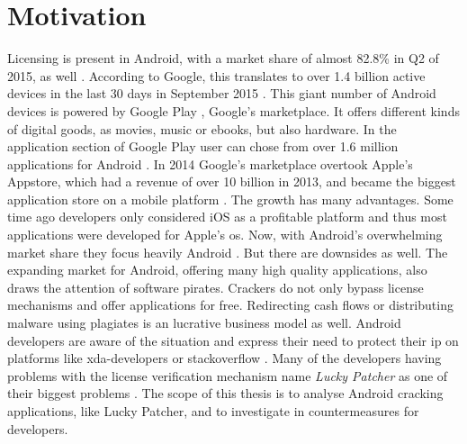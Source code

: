 \section{Motivation} \label{subsection:introduction-motivation}
Licensing is present in Android, with a market share of almost 82.8\% in Q2 of 2015, as well \cite{androidShare}.
According to Google, this translates to over 1.4 billion active devices in the last 30 days in September 2015 \cite{androidDevices}.
This giant number of Android devices is powered by Google Play \cite{googlePlay}, Google's marketplace.
It offers different kinds of digital goods, as movies, music or ebooks, but also hardware.
In the application section of Google Play user can chose from over 1.6 million applications for Android \cite{statistaAppStore}.
In 2014 Google's marketplace overtook Apple's Appstore, which had a revenue of over 10 billion in 2013, and became the biggest application store on a mobile platform \cite{wiwoValue}.
\newline
The growth has many advantages.
Some time ago developers only considered iOS as a profitable platform and thus most applications were developed for Apple's \gls{os}.
Now, with Android's overwhelming market share they focus heavily Android \cite{businessProfit}.
But there are downsides as well.
The expanding market for Android, offering many high quality applications, also draws the attention of software pirates.
Crackers do not only bypass license mechanisms and offer applications for free.
Redirecting cash flows or distributing malware using plagiates is an lucrative business model as well.
Android developers are aware of the situation \cite{developersPiracy} and express their need to protect their \gls{ip} on platforms like xda-developers \cite{xdaPiracy} or stackoverflow \cite{stackoverflowPiracy}.
Many of the developers having problems with the license verification mechanism name \textit{Lucky Patcher} as one of their biggest problems \cite{stackoverflowLucky}.
\newline
\newline
The scope of this thesis is to analyse Android cracking applications, like Lucky Patcher, and to investigate in countermeasures for developers.

